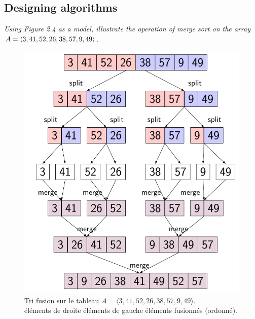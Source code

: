 \subsection{Designing algorithms}

\begin{description}
   {\itshape Using Figure 2.4 as a model, illustrate the operation of merge sort on the array $A =\\ \langle 3, 41, 52, 26, 38, 57, 9, 49\rangle$}.

    \begin{ex}
      \begin{figure}[H]
        \centering
          \includegraphics[scale=1]{img/2_3-1/2_3-1.pdf}
        \caption{Tri fusion sur le tableau $A =\langle 3, 41, 52, 26, 38, 57, 9, 49\rangle$.\\
           éléments de droite
           éléments de gauche
           éléments fusionnés (ordonné).}
      \end{figure}
      

\end{ex}
\end{description}
